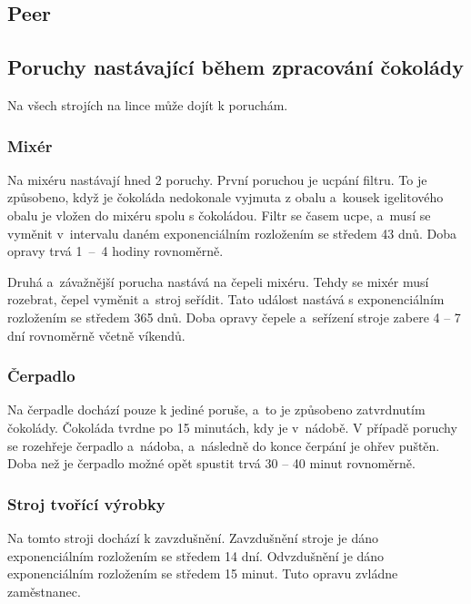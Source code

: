 \documentclass[11pt,a4paper,titlepage]{article}
\begin{document}
		\subsection{Peer}


		\subsection{Poruchy nastávající během zpracování čokolády}
			Na všech strojích na lince může dojít k poruchám.

			\subsubsection{Mixér}
				Na mixéru nastávají hned 2 poruchy.
				První poruchou je ucpání filtru. To je způsobeno,
				když je čokoláda nedokonale vyjmuta z obalu a~kousek igelitového
				obalu je vložen do mixéru spolu s čokoládou. Filtr se časem ucpe,
				a~musí se vyměnit v~intervalu daném exponenciálním rozložením se
				středem 43 dnů. Doba opravy trvá 1~--~4 hodiny rovnoměrně.

				Druhá a~závažnější porucha nastává na čepeli mixéru. Tehdy se mixér musí rozebrat,
				čepel vyměnit a~stroj seřídit. Tato událost nastává s exponenciálním rozložením se
				středem 365 dnů. Doba opravy čepele a~seřízení stroje zabere 4 -- 7 dní rovnoměrně včetně víkendů.


			\subsubsection{Čerpadlo}
				Na čerpadle dochází pouze k jediné poruše, a~to je způsobeno zatvrdnutím
				čokolády. Čokoláda tvrdne po 15 minutách, kdy je v~nádobě.
				V případě poruchy se rozehřeje čerpadlo a~nádoba, a~následně do konce čerpání
				je ohřev puštěn. Doba než je čerpadlo možné opět spustit trvá 30 -- 40 minut rovnoměrně.

			\subsubsection{Stroj tvořící výrobky}
				Na tomto stroji dochází k zavzdušnění. Zavzdušnění stroje je dáno
				exponenciálním rozložením se středem 14 dní. Odvzdušnění je dáno
				exponenciálním rozložením se středem 15 minut. Tuto opravu zvládne zaměstnanec.
\end{document}
